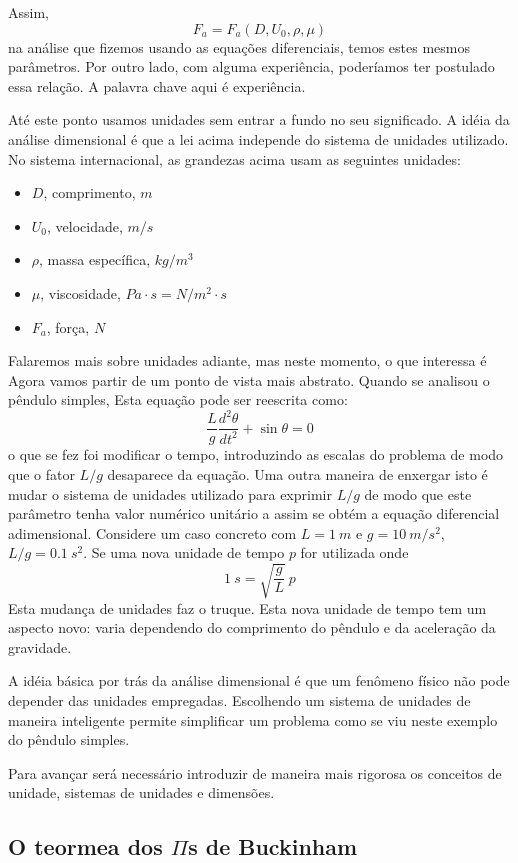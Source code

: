Assim,
\[
F_a = F_a(D, U_0, \rho, \mu)
\]
na análise que fizemos usando as equações diferenciais, temos estes mesmos parâmetros. Por outro lado, com alguma experiência, poderíamos ter postulado essa relação. A palavra chave aqui é experiência.

Até este ponto usamos unidades sem entrar a fundo no seu significado. A idéia da análise dimensional é que a lei acima independe do sistema de unidades utilizado. No sistema internacional, as grandezas acima usam as seguintes unidades:

\begin{itemize}
\item $D$, comprimento, $m$
\item $U_0$, velocidade, $m/s$
\item $\rho$, massa específica, $kg/m^3$
\item $\mu$, viscosidade, $Pa\cdot s = N/m^2 \cdot s$
\item $F_a$, força, $N$
\end{itemize}

Falaremos mais sobre unidades adiante, mas neste momento, o que interessa é
 Agora vamos partir de um ponto de vista mais abstrato.
Quando se analisou o pêndulo simples, 
Esta equação pode ser reescrita como:
\[
\frac{L}{g}\frac{d^2\theta}{dt^2} + \sin\theta = 0 
\]
o que se fez foi modificar o tempo, introduzindo as escalas do problema de modo que o fator $L/g$ desaparece da equação. Uma outra maneira de enxergar isto é mudar o sistema de unidades utilizado para exprimir $L/g$ de modo que este parâmetro tenha valor numérico unitário a assim se obtém a equação diferencial adimensional. Considere um caso concreto com $L = 1\:m$ e $g = 10\: m/s^2$, $L/g=0.1\:s^2$. Se uma nova unidade de tempo $p$ for utilizada onde 
\[
1\:s = \sqrt{\frac{g}{L}}\:p
\] 
Esta mudança de unidades faz o truque. Esta nova unidade de tempo tem um aspecto novo: varia dependendo do comprimento do pêndulo e da aceleração da gravidade.

A idéia básica por trás da análise dimensional é que um fenômeno físico não pode depender das unidades empregadas. Escolhendo um sistema de unidades de maneira inteligente permite simplificar um problema como se viu neste exemplo do pêndulo simples.

Para avançar será necessário introduzir de maneira mais rigorosa os conceitos de unidade, sistemas de unidades e dimensões.

\subsection{O teormea dos $\Pi$s de Buckinham}
